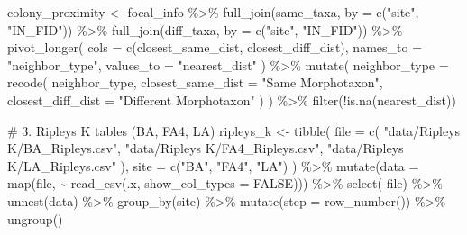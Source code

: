\documentclass[
  letterpaper,
  DIV=11,
  numbers=noendperiod]{scrartcl}
\newenvironment{Shaded}{\begin{snugshade}}{\end{snugshade}}
\newcommand{\AttributeTok}[1]{\textcolor[rgb]{0.40,0.45,0.13}{#1}}
\newcommand{\CommentTok}[1]{\textcolor[rgb]{0.37,0.37,0.37}{#1}}
\newcommand{\ConstantTok}[1]{\textcolor[rgb]{0.56,0.35,0.01}{#1}}
\newcommand{\FunctionTok}[1]{\textcolor[rgb]{0.28,0.35,0.67}{#1}}
\newcommand{\NormalTok}[1]{\textcolor[rgb]{0.00,0.23,0.31}{#1}}
\newcommand{\OtherTok}[1]{\textcolor[rgb]{0.00,0.23,0.31}{#1}}
\newcommand{\SpecialCharTok}[1]{\textcolor[rgb]{0.37,0.37,0.37}{#1}}
\newcommand{\StringTok}[1]{\textcolor[rgb]{0.13,0.47,0.30}{#1}}
\begin{document}
\begin{Shaded}
\begin{Highlighting}[]
\NormalTok{colony\_proximity }\OtherTok{\textless{}{-}}\NormalTok{ focal\_info }\SpecialCharTok{\%\textgreater{}\%}
  \FunctionTok{full\_join}\NormalTok{(same\_taxa, }\AttributeTok{by =} \FunctionTok{c}\NormalTok{(}\StringTok{"site"}\NormalTok{, }\StringTok{"IN\_FID"}\NormalTok{)) }\SpecialCharTok{\%\textgreater{}\%}
  \FunctionTok{full\_join}\NormalTok{(diff\_taxa, }\AttributeTok{by =} \FunctionTok{c}\NormalTok{(}\StringTok{"site"}\NormalTok{, }\StringTok{"IN\_FID"}\NormalTok{)) }\SpecialCharTok{\%\textgreater{}\%}
  \FunctionTok{pivot\_longer}\NormalTok{(}
    \AttributeTok{cols =} \FunctionTok{c}\NormalTok{(closest\_same\_dist, closest\_diff\_dist),}
    \AttributeTok{names\_to =} \StringTok{"neighbor\_type"}\NormalTok{,}
    \AttributeTok{values\_to =} \StringTok{"nearest\_dist"}
\NormalTok{  ) }\SpecialCharTok{\%\textgreater{}\%}
  \FunctionTok{mutate}\NormalTok{(}
    \AttributeTok{neighbor\_type =} \FunctionTok{recode}\NormalTok{(}
\NormalTok{      neighbor\_type,}
      \AttributeTok{closest\_same\_dist =} \StringTok{"Same Morphotaxon"}\NormalTok{,}
      \AttributeTok{closest\_diff\_dist =} \StringTok{"Different Morphotaxon"}
\NormalTok{    )}
\NormalTok{  ) }\SpecialCharTok{\%\textgreater{}\%}
  \FunctionTok{filter}\NormalTok{(}\SpecialCharTok{!}\FunctionTok{is.na}\NormalTok{(nearest\_dist))}

\CommentTok{\# 3. Ripley\textquotesingle{}s K tables (BA, FA4, LA)}
\NormalTok{ripleys\_k }\OtherTok{\textless{}{-}} \FunctionTok{tibble}\NormalTok{(}
  \AttributeTok{file =} \FunctionTok{c}\NormalTok{(}
    \StringTok{"data/Ripleys K/BA\_Ripley\textquotesingle{}s.csv"}\NormalTok{,}
    \StringTok{"data/Ripleys K/FA4\_Ripley\textquotesingle{}s.csv"}\NormalTok{,}
    \StringTok{"data/Ripleys K/LA\_Ripley\textquotesingle{}s.csv"}
\NormalTok{  ),}
  \AttributeTok{site =} \FunctionTok{c}\NormalTok{(}\StringTok{"BA"}\NormalTok{, }\StringTok{"FA4"}\NormalTok{, }\StringTok{"LA"}\NormalTok{)}
\NormalTok{) }\SpecialCharTok{\%\textgreater{}\%}
  \FunctionTok{mutate}\NormalTok{(}\AttributeTok{data =} \FunctionTok{map}\NormalTok{(file, }\SpecialCharTok{\textasciitilde{}} \FunctionTok{read\_csv}\NormalTok{(.x, }\AttributeTok{show\_col\_types =} \ConstantTok{FALSE}\NormalTok{))) }\SpecialCharTok{\%\textgreater{}\%}
  \FunctionTok{select}\NormalTok{(}\SpecialCharTok{{-}}\NormalTok{file) }\SpecialCharTok{\%\textgreater{}\%}
  \FunctionTok{unnest}\NormalTok{(data) }\SpecialCharTok{\%\textgreater{}\%}
  \FunctionTok{group\_by}\NormalTok{(site) }\SpecialCharTok{\%\textgreater{}\%}
  \FunctionTok{mutate}\NormalTok{(}\AttributeTok{step =} \FunctionTok{row\_number}\NormalTok{()) }\SpecialCharTok{\%\textgreater{}\%}
  \FunctionTok{ungroup}\NormalTok{()}


\end{Highlighting}
\end{Shaded}
\end{document}
